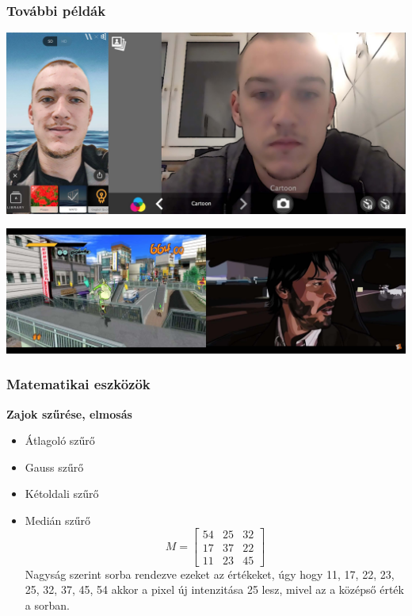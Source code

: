 \documentclass{beamer}
\begin{document}
\begin{frame}[fragile]
\frametitle{További példák}

\begin{center}
\includegraphics[scale=0.1]{kepek/muveszi_szurok/prismawebcam.jpg}
\end{center}

\begin{center}
\includegraphics[scale=0.1]{kepek/muveszi_szurok/jatekfilm.jpg}
\end{center}

\end{frame}

\begin{frame}[fragile]
\frametitle{Matematikai eszközök}

\textbf{Zajok szűrése, elmosás}

\begin{itemize}
\item Átlagoló szűrő
\item Gauss szűrő
\item Kétoldali szűrő
\item Medián szűrő
$$M =
\begin{bmatrix}
54 &25  &32 \\ 
17 &37  &22 \\ 
11 &23  &45 
\end{bmatrix}$$
Nagyság szerint sorba rendezve ezeket az értékeket, úgy hogy  11, 17, 22, 23, 25, 32, 37, 45, 54 akkor a pixel új intenzitása 25 lesz, mivel az a középső érték a sorban.
\end{itemize}
\end{frame}
\end{document}
